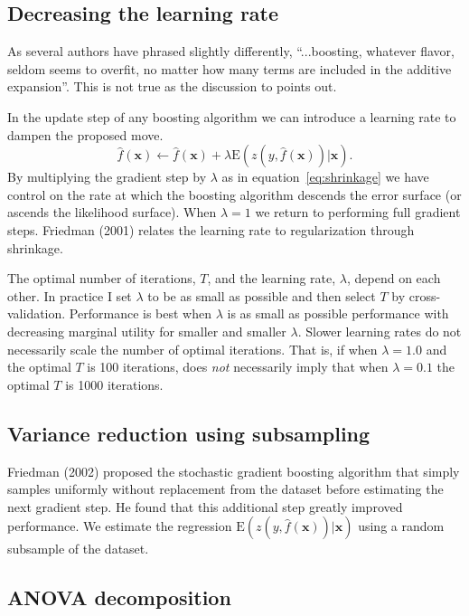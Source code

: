 \documentclass{article}
\newcommand{\EV}{\mathrm{E}}
\begin{document}
\subsection{Decreasing the learning rate}
As several authors have phrased slightly differently, ``...boosting, whatever flavor, seldom seems to overfit, no matter how many terms are included in the additive expansion''. This is not true as the discussion to \cite{FHT:2000} points out.

In the update step of any boosting algorithm we can introduce a learning rate to dampen the proposed move.
\begin{equation}
\label{eq:shrinkage} \hat f(\mathbf{x}) \leftarrow \hat f(\mathbf{x}) + \lambda \EV(z(y,\hat f(\mathbf{x}))|\mathbf{x}).
\end{equation}
By multiplying the gradient step by $\lambda$ as in equation~\ref{eq:shrinkage} we have control on the rate at which the boosting algorithm descends the error surface (or ascends the likelihood surface). When $\lambda=1$ we return to performing full gradient steps. Friedman (2001) relates the learning rate to regularization through shrinkage.

The optimal number of iterations, $T$, and the learning rate, $\lambda$, depend on each other. In practice I set $\lambda$ to be as small as possible and then select $T$ by cross-validation. Performance is best when $\lambda$ is as small as possible performance with decreasing marginal utility for smaller and smaller $\lambda$. Slower learning rates do not necessarily scale the number of optimal iterations. That is, if when $\lambda=1.0$ and the optimal $T$ is 100 iterations, does {\it not} necessarily imply that when $\lambda=0.1$ the optimal $T$ is 1000 iterations.

\subsection{Variance reduction using subsampling}

Friedman (2002) proposed the stochastic gradient boosting algorithm that simply samples uniformly without
replacement from the dataset before estimating the next gradient step. He found that this additional step greatly improved performance. We estimate the regression $\EV(z(y,\hat f(\mathbf{x}))|\mathbf{x})$ using a random subsample of the dataset.

\subsection{ANOVA decomposition}
\end{document}
